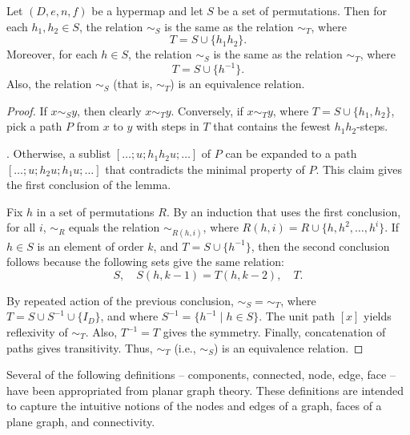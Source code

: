 \begin{lemma}\label{lemma:er} %
Let $(D,e,n,f)$ be a hypermap and let $S$ be a  set of permutations.
Then for each $h_1,h_2\in S$, 
the relation $\sim_S$ is the same as the relation $\sim_T$, where
\[ 
T = S \cup \{h_1h_2\}.
\] 
Moreover, for each $h\in S$, 
the relation $\sim_S$ is the same as the relation $\sim_T$, where
\[ 
T = S \cup \{h^{-1}\}.
\] 
Also,  the relation $\sim_S$ (that is, $\sim_T$) is an equivalence relation.  
%
\end{lemma}

\begin{proof} If $x\sim_S y$, then clearly $x\sim_T y$.  Conversely, if
  $x\sim_T y$, where $T = S\cup\{h_1,h_2\}$, pick a path $P$ from $x$
  to $y$ with steps in $T$ that contains the fewest $h_1h_2$-steps.

  .  Otherwise, a
  sublist $[\ldots;u;h_1h_2u;\ldots]$ of $P$ can be expanded to a path
  $[\ldots;u;h_2u;h_1u;\ldots]$ that contradicts the minimal property
  of $P$. This claim gives the first conclusion of the lemma.

 Fix $h$ in a set of
permutations $R$.  By an induction that uses the first conclusion, for
all $i$, $\sim_R$ equals the relation $\sim_{R(h,i)}$, where $R(h,i) =
R \cup \{h,h^2,\ldots,h^i\}$.  If $h\in S$ is an element of order $k$,
and $T = S\cup\{h^{-1}\}$, then the second conclusion follows because
the following sets give the same relation:
\[ 
S,\quad S(h,k-1) = T(h,k-2),\quad T.
\] 

By repeated action of the previous conclusion, $\sim_S=\sim_T$, where
$T = S\cup S^{-1}\cup \{I_D\}$, and where $S^{-1} = \{h^{-1}\mid h\in
S\}$.  The unit path $[x]$ yields reflexivity of $\sim_T$.  Also,
$T^{-1} = T$ gives the symmetry.  Finally, concatenation of paths
gives transitivity.  Thus, $\sim_T$ (i.e., $\sim_S$) is an equivalence
relation.
\end{proof}

Several of the following definitions -- components, connected, node,
edge, face -- have been appropriated from planar graph theory.  These
definitions are intended to capture the intuitive notions of the nodes
and edges of a graph, faces of a plane graph, and connectivity.

